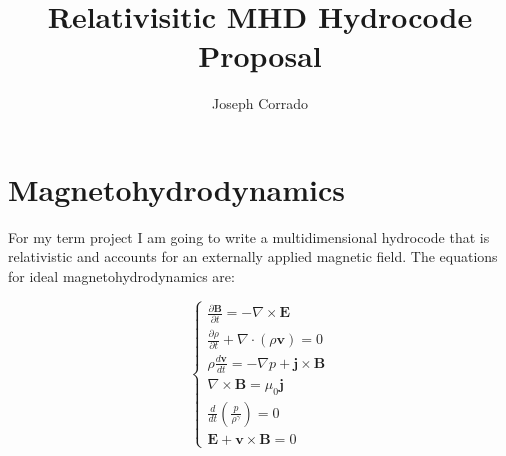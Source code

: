 \documentclass[a4paper]{article}
\begin{document}
\author{Joseph Corrado}
\title{Relativisitic MHD Hydrocode Proposal}
\maketitle

\section{Magnetohydrodynamics}
For my term project I am going to write a multidimensional hydrocode that is relativistic and accounts for an externally applied magnetic field. The equations for ideal magnetohydrodynamics are:

\[
        \begin{cases}
                \frac{\partial \bm{B}}{\partial t}=-\nabla \times \bm{E}\\
                \frac{\partial \rho}{\partial t }+\nabla \cdot (\rho \bm{v})=0\\
                \rho \frac{d \bm{v}}{dt}=-\nabla p +\bm{j}\times \bm{B}\\
                \nabla \times \bm{B}=\mu_0 \bm{j}\\
                \frac{d}{dt}\left( \frac{p}{\rho^{\gamma}} \right)=0\\
                \bm{E}+\bm{v}\times \bm{B}=0
        \end{cases}
\]
\end{document}
